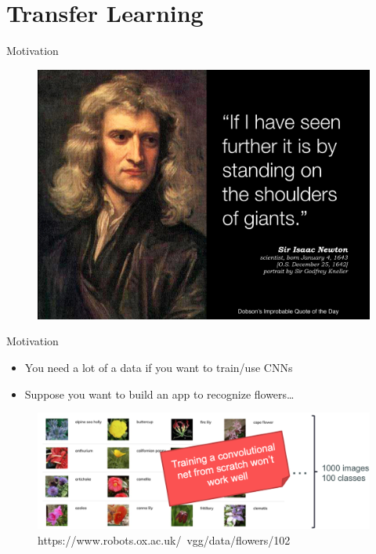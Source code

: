\documentclass[serif, aspectratio=169]{beamer}
\begin{document}
\section{Transfer Learning}

\begin{frame}{Motivation}
	\begin{figure}[htpb]
		\begin{center}
			\includegraphics[keepaspectratio, scale=0.25]{pic/giant}
		\end{center}
	\end{figure}
\end{frame}

\begin{frame}{Motivation}
	\begin{itemize}
		\item You need a lot of a data if you want to train/use CNNs
		\item Suppose you want to build an app to recognize flowers…
	\end{itemize}
	\begin{figure}[htpb]
		\begin{center}
			\includegraphics[keepaspectratio, scale=0.25]{pic/TL_motiv}
			\caption*{\scriptsize https://www.robots.ox.ac.uk/~vgg/data/flowers/102}
		\end{center}
	\end{figure}
\end{frame}
\end{document}
